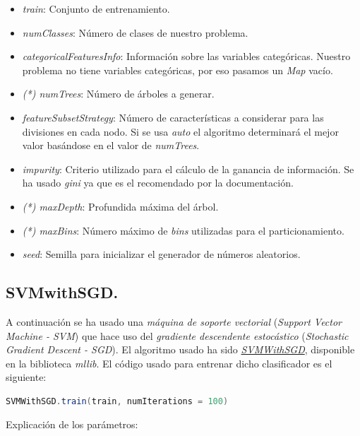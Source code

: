 \documentclass[11pt]{article}
\begin{document}
\begin{itemize}
	\item \textit{train}: Conjunto de entrenamiento.
	\item \textit{numClasses}: Número de clases de nuestro problema.
	\item \textit{categoricalFeaturesInfo}: Información sobre las variables categóricas. Nuestro problema no tiene variables categóricas, por eso pasamos un \textit{Map} vacío.
	\item \textit{(*) numTrees}: Número de árboles a generar.
	\item \textit{featureSubsetStrategy}: Número de características a considerar para las divisiones en cada nodo. Si se usa \textit{auto} el algoritmo determinará el mejor valor basándose en el valor de \textit{numTrees}.
	\item \textit{impurity}: Criterio utilizado para el cálculo de la ganancia de información. Se ha usado \textit{gini} ya que es el recomendado por la documentación.
	\item \textit{(*) maxDepth}: Profundida máxima del árbol.
	\item \textit{(*) maxBins}: Número máximo de \textit{bins} utilizadas para el particionamiento.
	\item \textit{seed}: Semilla para inicializar el generador de números aleatorios.
\end{itemize}

\subsection{SVMwithSGD.}

A continuación se ha usado una \textit{máquina de soporte vectorial} (\textit{Support Vector Machine - SVM}) que hace uso del \textit{gradiente descendente estocástico} (\textit{Stochastic Gradient Descent - SGD}). El algoritmo usado ha sido \href{https://spark.apache.org/docs/2.2.0/api/scala/index.html#org.apache.spark.mllib.classification.SVMWithSGD}{\textit{SVMWithSGD}}, disponible en la biblioteca \textit{mllib}. El código usado para entrenar dicho clasificador es el siguiente:

\begin{lstlisting}[frame=single, language=scala, xleftmargin=.25in, basicstyle=\small, upquote=true, breaklines = true]
SVMWithSGD.train(train, numIterations = 100)
\end{lstlisting}

Explicación de los parámetros:
\end{document}
